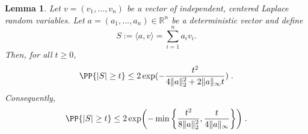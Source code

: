 \documentclass{article}
\newcommand{\1}{\mathds{1}}
\DeclarePairedDelimiter{\paren}{\lparen}{\rparen}
\theoremstyle{plain}
\newtheorem{lemma}{Lemma}[section]
\theoremstyle{definition}
\theoremstyle{remark}
\begin{document}
\begin{lemma}
\label{lemma:tail_bound_sum_of_laplace}
    Let $v=(v_1,\dots,v_n)$ be a vector of independent, centered Laplace random variables. Let $a=(a_1,\dots,a_n)\in\mathbb R^n$ be a deterministic vector and define
\begin{equation}
    S := \langle a, v\rangle = \sum_{i=1}^n a_i v_i .
\end{equation}
Then, for all $t\geq 0$,
\begin{equation}
    \PP{|S|\geq t}
    \leq
    2\exp \paren{-\frac{t^2}{4\|a\|_2^2 + 2\|a\|_\infty t}} \;.
\end{equation}
Consequently,
\begin{equation}
    \PP{|S|\geq t}
    \leq
    2\exp \paren*{-\min\left\{
\frac{t^2}{8\|a\|_2^2},
\frac{t}{4\|a\|_\infty}
\right\}} \;.
\end{equation}
\end{lemma}
\end{document}
